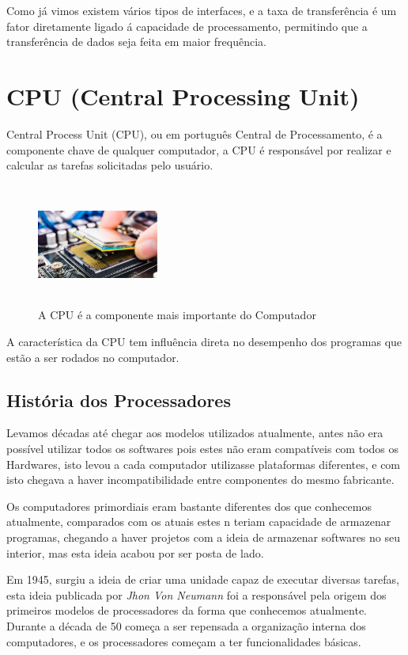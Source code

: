 \documentclass{report}
\begin{document}
Como já vimos existem vários tipos de interfaces, e a taxa de transferência é um fator diretamente ligado á capacidade de processamento, permitindo que a transferência de dados seja feita em maior frequência.  

\chapter{CPU (Central Processing Unit)}
\label{chap.CPU}

Central Process Unit (\ac{CPU}), ou em português Central de Processamento, é a componente chave de qualquer computador, a \ac{CPU} é responsável por realizar e calcular as tarefas solicitadas pelo usuário. 

\begin{figure}
\center
\includegraphics[width=4cm, height=4cm]{Imagens/cpu1.jpg}
\caption{A CPU é a componente mais importante do Computador}
\end{figure} 

A característica da \ac{CPU} tem influência direta no desempenho dos programas que estão a ser rodados no computador.

\section{História dos Processadores}
\label{sect.História dos Processadores}

Levamos décadas até chegar aos modelos utilizados atualmente, antes não era possível utilizar todos os softwares pois estes não eram compatíveis com todos os Hardwares, isto levou a cada computador utilizasse plataformas diferentes, e com isto chegava a haver incompatibilidade entre componentes do mesmo fabricante.

Os computadores primordiais eram bastante diferentes dos que conhecemos atualmente, comparados com os atuais estes n teriam capacidade de armazenar programas, chegando a haver projetos com a ideia de armazenar softwares no seu interior, mas esta ideia acabou por ser posta de lado.

Em 1945, surgiu a ideia de criar uma unidade capaz de executar diversas tarefas, esta ideia publicada por \textit{Jhon Von Neumann} foi a responsável pela origem dos primeiros modelos de processadores da forma que conhecemos atualmente. Durante a década de 50 começa a ser repensada a organização interna dos computadores, e os processadores começam a ter funcionalidades básicas.
\end{document}
